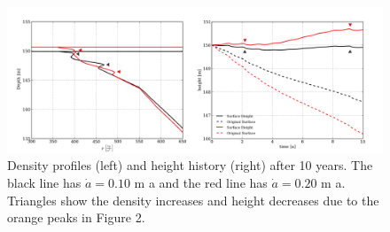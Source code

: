 \begin{figure}
  \centering
    \includegraphics[width=\linewidth]{images/firn/density_height.png}
	\caption{Density profiles (left) and height history (right) after 10 years.  The black line has $\dot{a} = 0.10$ m a and the red line has $\dot{a} = 0.20$ m a.  Triangles show the density increases and height decreases due to the orange peaks in Figure 2.}
\end{figure}
